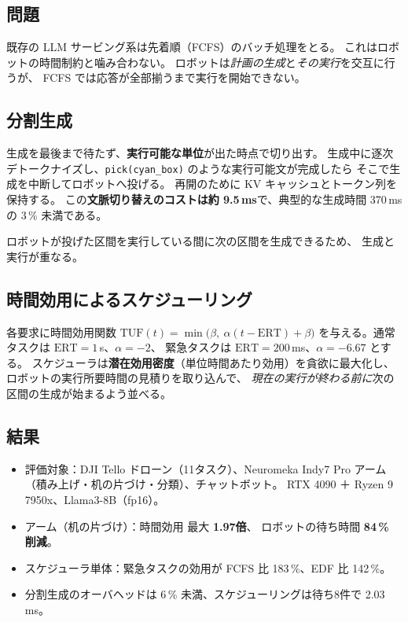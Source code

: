 \documentclass[11pt,a4paper]{article}
\newcommand{\code}[1]{\texttt{#1}}
\newcommand{\keyp}[1]{\textbf{\textcolor{blue!45!black}{#1}}}
\begin{document}
\subsection*{問題}

既存の LLM サービング系は先着順（FCFS）のバッチ処理をとる。
これはロボットの時間制約と噛み合わない。
ロボットは\emph{計画の生成}と\emph{その実行}を交互に行うが、
FCFS では応答が全部揃うまで実行を開始できない。

\subsection*{分割生成}

生成を最後まで待たず、\keyp{実行可能な単位}が出た時点で切り出す。
生成中に逐次デトークナイズし、\code{pick(cyan\_box)} のような実行可能文が完成したら
そこで生成を中断してロボットへ投げる。
再開のために KV キャッシュとトークン列を保持する。
この\keyp{文脈切り替えのコストは約 9.5\,ms}で、典型的な生成時間 370\,ms の 3\,\% 未満である。

ロボットが投げた区間を実行している間に次の区間を生成できるため、
生成と実行が重なる。

\subsection*{時間効用によるスケジューリング}

各要求に時間効用関数 $\mathrm{TUF}(t)=\min\bigl(\beta,\ \alpha(t-\mathrm{ERT})+\beta\bigr)$
を与える。通常タスクは $\mathrm{ERT}=1$\,s、$\alpha=-2$、
緊急タスクは $\mathrm{ERT}=200$\,ms、$\alpha=-6.67$ とする。
スケジューラは\keyp{潜在効用密度}（単位時間あたり効用）を貪欲に最大化し、
ロボットの実行所要時間の見積りを取り込んで、
\emph{現在の実行が終わる前に}次の区間の生成が始まるよう並べる。

\subsection*{結果}

\begin{itemize}[leftmargin=1.4em,itemsep=2pt]
  \item 評価対象：DJI Tello ドローン（11タスク）、Neuromeka Indy7 Pro アーム
        （積み上げ・机の片づけ・分類）、チャットボット。
        RTX 4090 ＋ Ryzen 9 7950x、Llama3-8B（fp16）。
  \item アーム（机の片づけ）：時間効用 最大 \keyp{1.97倍}、
        ロボットの待ち時間 \keyp{84\,\% 削減}。
  \item スケジューラ単体：緊急タスクの効用が FCFS 比 183\,\%、EDF 比 142\,\%。
  \item 分割生成のオーバヘッドは 6\,\% 未満、スケジューリングは待ち8件で 2.03\,ms。
\end{itemize}
\end{document}
